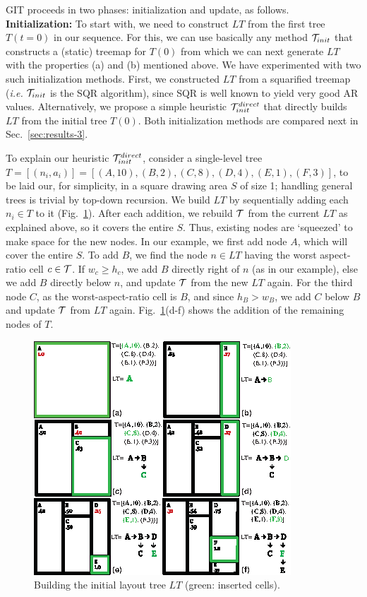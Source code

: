 GIT proceeds in two phases: initialization and update, as follows.\\

\noindent\textbf{Initialization:} To start with, we need to construct $LT$ from the first tree $T(t=0)$ in our sequence. For this, we can use basically any method ${\cal T}_{init}$ that constructs a (static) treemap for $T(0)$ from which we can next generate $LT$ with the properties (a) and (b) mentioned above. We have experimented with two such initialization methods. First, we constructed $LT$ from a squarified treemap (\emph{i.e.} ${\cal T}_{init}$ is the SQR algorithm), since SQR is well known to yield very good AR values. Alternatively, we propose a simple heuristic ${\cal T}_{init}^{direct}$ that directly builds $LT$ from the initial tree $T(0)$. Both initialization methods are compared next in Sec.~\ref{sec:results-3}.

To explain our heuristic ${\cal T}_{init}^{direct}$, consider a single-level tree $T = [(n_i,a_i)]  =  [ (A, 10), (B, 2), (C, 8), (D, 4), (E, 1), (F, 3) ]$, to be laid our, for simplicity, in a square drawing area $S$ of size 1; handling general trees is trivial by top-down recursion. We build $LT$ by sequentially adding each $n_i \in T$ to it (Fig.~\ref{fig:git_example}). After each addition, we rebuild ${\cal T}$ from the current $LT$ as explained above, so it covers the entire $S$. Thus, existing nodes are `squeezed' to make space for the new nodes. In our example, we first add node $A$, which will cover the entire $S$. To add $B$, we find the node $n \in LT$ having the worst aspect-ratio cell $c \in {\cal T}$. If $w_c \geq h_c$, we add $B$ directly right of $n$ (as in our example), else we add $B$ directly below $n$, and update ${\cal T}$ from the new $LT$ again. For the third node $C$, as the worst-aspect-ratio cell is $B$, and since $h_B > w_B$, we add $C$ below $B$ and update ${\cal T}$ from $LT$ again. Fig.~\ref{fig:git_example}(d-f) shows the addition of the remaining nodes of $T$.\\

\begin{figure}[htbp!]
\centering
\includegraphics[width=.8\textwidth]{figures/treemap-algorithm/git_example.eps}
\caption{Building the initial layout tree $LT$ (green: inserted cells).}
\label{fig:git_example}
\end{figure}


